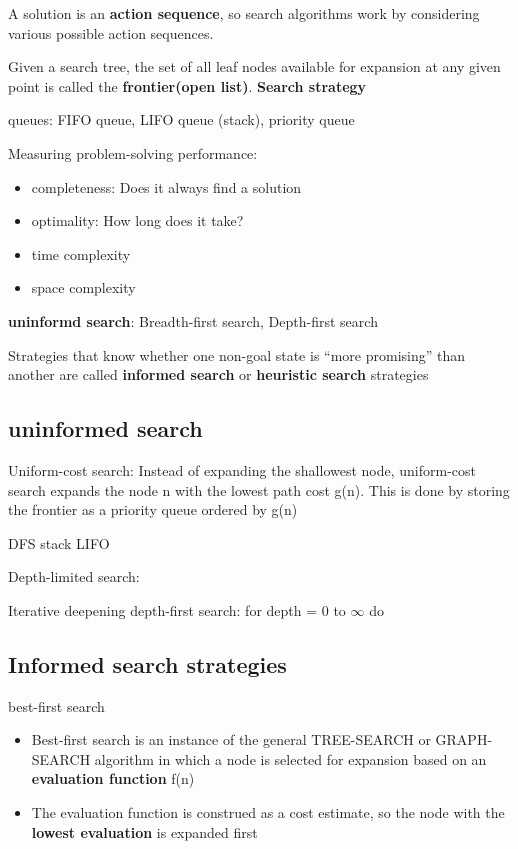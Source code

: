 \documentclass[11pt]{article}
\begin{document}
A solution is an \textbf{action sequence}, so search algorithms work
by considering various possible action sequences.


Given a search tree, the set of all leaf nodes available for expansion at any
given point is called the \textbf{frontier(open list)}. \textbf{Search strategy}


queues: FIFO queue, LIFO queue (stack), priority queue


Measuring problem-solving performance: 
\begin{itemize}
\item completeness: Does it always find a solution
\item optimality: How long does it take?
\item time complexity
\item space complexity
\end{itemize}


\textbf{uninformd search}: Breadth-first search, Depth-first search


Strategies that know whether one non-goal state is “more promising” than
another are called \textbf{informed search} or \textbf{heuristic search} strategies

\subsection{uninformed search}
\label{sec:org48d7a71}
Uniform-cost search: Instead of expanding the shallowest node, uniform-cost
search expands the node n with the lowest path cost g(n). This is done by
storing the frontier as a priority queue ordered by g(n)


DFS stack LIFO


Depth-limited search: 


Iterative deepening depth-first search: for depth = 0 to \(\infty\) do

\subsection{Informed search strategies}
\label{sec:orga3dfded}
best-first search
\begin{itemize}
\item Best-first search is an instance of the general TREE-SEARCH or GRAPH-SEARCH
algorithm in which a node is selected for expansion based on an \textbf{evaluation
function} f(n)
\item The evaluation function is construed as a cost estimate, so the node with
the \textbf{lowest evaluation} is expanded first
\end{itemize}
\end{document}
